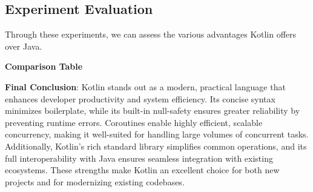 \vspace{1em}

\subsection{Experiment Evaluation}

Through these experiments, we can assess the various advantages Kotlin offers over Java. 
\vspace{1em}

\noindent \textbf{Comparison Table}

\vspace{1em}

\begin{table}[H]
\centering
{}
\caption{Comparison of Kotlin and Java}
\label{tab:comparison}
\end{table}


\vspace{1em}

\noindent \textbf{Final Conclusion}: Kotlin stands out as a modern, practical language that enhances developer productivity and system efficiency. Its concise syntax minimizes boilerplate, while its built-in null-safety ensures greater reliability by preventing runtime errors. Coroutines enable highly efficient, scalable concurrency, making it well-suited for handling large volumes of concurrent tasks. Additionally, Kotlin’s rich standard library simplifies common operations, and its full interoperability with Java ensures seamless integration with existing ecosystems. These strengths make Kotlin an excellent choice for both new projects and for modernizing existing codebases.
